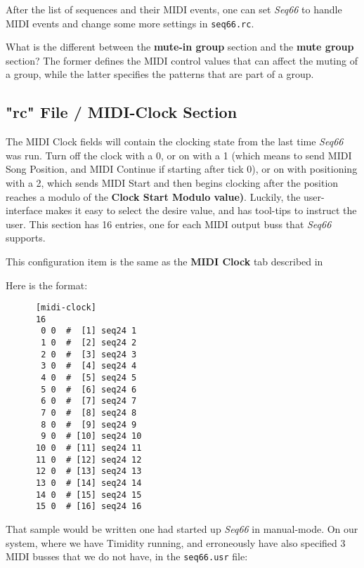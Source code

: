    After the list of sequences and their MIDI events, one can 
   set \textsl{Seq66} to handle MIDI events and change some more settings
   in \texttt{seq66.rc}.

   What is the different between the \textbf{mute-in group}
   section and the \textbf{mute group} section?  The former defines the MIDI
   control values that can affect the muting of a group, while the latter
   specifies the patterns that are part of a group.

\subsection{"rc" File / MIDI-Clock Section}
\label{subsec:rc_file_midi_clock}

   The MIDI Clock fields will contain the clocking state from the last 
   time \textsl{Seq66} was run.  Turn off the clock with a 0, or on
   with a 1 (which means to send MIDI Song Position, and MIDI Continue if
   starting after tick 0), or on with positioning with a 2, which sends MIDI
   Start and then begins clocking after the position reaches a modulo of the
   \textbf{Clock Start Modulo value)}.  Luckily, the user-interface makes it
   easy to select the desire value, and has tool-tips to instruct the user.
   This section has 16 entries, one for each MIDI output buss that
   \textsl{Seq66} supports.

   This configuration item is the same as the 
   \textbf{MIDI Clock} tab described in
   
   Here is the format:

   \begin{verbatim}
      [midi-clock]
      16
       0 0  #  [1] seq24 1
       1 0  #  [2] seq24 2
       2 0  #  [3] seq24 3
       3 0  #  [4] seq24 4
       4 0  #  [5] seq24 5
       5 0  #  [6] seq24 6
       6 0  #  [7] seq24 7
       7 0  #  [8] seq24 8
       8 0  #  [9] seq24 9
       9 0  # [10] seq24 10
      10 0  # [11] seq24 11
      11 0  # [12] seq24 12
      12 0  # [13] seq24 13
      13 0  # [14] seq24 14
      14 0  # [15] seq24 15
      15 0  # [16] seq24 16
   \end{verbatim}

   That sample would be written one had started up \textsl{Seq66} in
   manual-mode.  On our system, where we have Timidity running, and
   erroneously have also specified 3 MIDI busses that we do not have, in the
   \texttt{seq66.usr} file:

